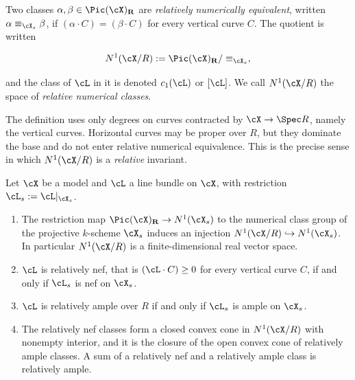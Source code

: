\begin{definition}
\label{def:ch20-relative-numerical}
Two classes \(\alpha,\beta\in\Pic(\cX)_{\mathbf R}\) are
\emph{relatively numerically equivalent}, written
\(\alpha\equiv_{\cX_s}\beta\), if \((\alpha\cdot C)=(\beta\cdot C)\) for
every vertical curve \(C\).  The quotient is written

\begin{equation}
\label{eq:ch20-n1-definition}
 N^1(\cX/R):=\Pic(\cX)_{\mathbf R}/\equiv_{\cX_s},
\end{equation}

and the class of \(\cL\) in it is denoted \(c_1(\cL)\) or
\([\cL]\).  We call \(N^1(\cX/R)\) the space of \emph{relative numerical
classes}.
\end{definition}

The definition uses only degrees on curves contracted by
\(\cX\to\Spec R\), namely the vertical curves.  Horizontal curves may be
proper over \(R\), but they dominate the base and do not enter relative
numerical equivalence.  This is the precise sense in which
\(N^1(\cX/R)\) is a \emph{relative} invariant.

\begin{lemma}
\label{lem:ch20-special-fibre-test}
Let \(\cX\) be a model and \(\cL\) a line bundle on \(\cX\), with
restriction \(\cL_s:=\cL|_{\cX_s}\).
\begin{enumerate}
\item\label{itm:ch20-sft:inject} The restriction map
 \(\Pic(\cX)_{\mathbf R}\to N^1(\cX_s)\) to the numerical class group of the
 projective \(k\)-scheme \(\cX_s\) induces an injection
 \(N^1(\cX/R)\hookrightarrow N^1(\cX_s)\).  In particular
 \(N^1(\cX/R)\) is a finite-dimensional real vector space.
\item\label{itm:ch20-sft:nef} \(\cL\) is relatively nef, that is
 \((\cL\cdot C)\geq0\) for every vertical curve \(C\), if and only if
 \(\cL_s\) is nef on \(\cX_s\).
\item\label{itm:ch20-sft:ample} \(\cL\) is relatively ample over \(R\) if
 and only if \(\cL_s\) is ample on \(\cX_s\).
\item\label{itm:ch20-sft:cone} The relatively nef classes form a closed
 convex cone in \(N^1(\cX/R)\) with nonempty interior, and it is the closure
 of the open convex cone of relatively ample classes.  A sum of a relatively
 nef and a relatively ample class is relatively ample.
\end{enumerate}
\end{lemma}


